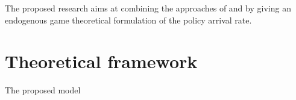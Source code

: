 \documentclass[american]{scrartcl}
\begin{document}
The proposed research aims at combining the approaches of \citeauthor{Ploeg2020} and \citeauthor{Barnett2019} by giving an endogenous game theoretical formulation of the policy arrival rate.

\section{Theoretical framework}

The proposed model


\iffalse
    \section{Empirical approach}

    \section{Conclusion}

\fi

\newpage
\nocite{*}
\printbibliography
\end{document}
